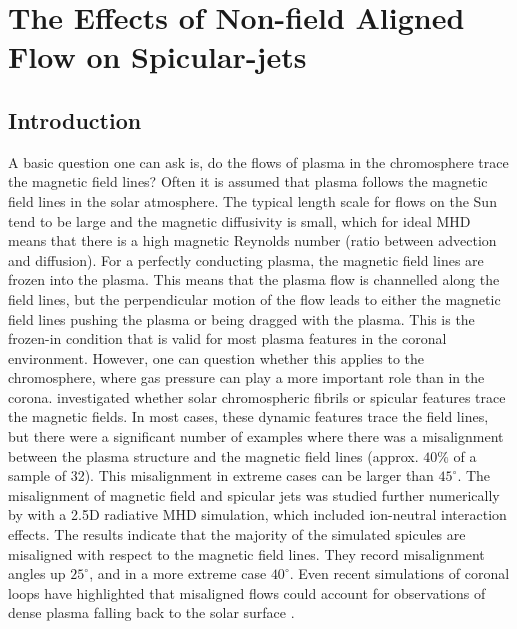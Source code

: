 \documentclass[12pt]{ociamthesis}
\newcommand{\np}{\\ \\}
\newcommand{\degs}{^{\circ}}
\begin{document}
\baselineskip=18pt

\setcounter{secnumdepth}{3}
\setcounter{tocdepth}{3}

\setcounter{chapter}{2}

\chapter{The Effects of Non-field Aligned Flow on Spicular-jets}
\section{Introduction}
\label{sec:c3intro}
A basic question one can ask is, do the flows of plasma in the chromosphere trace the magnetic field lines? Often it is assumed that plasma follows the magnetic field lines in the solar atmosphere. The typical length scale for flows on the Sun tend to be large and the magnetic diffusivity is small, which for ideal MHD means that there is a high magnetic Reynolds number (ratio between advection and diffusion). For a perfectly conducting plasma, the magnetic field lines are frozen into the plasma. This means that the plasma flow is channelled along the field lines, but the perpendicular motion of the flow leads to either the magnetic field lines pushing the plasma or being dragged with the plasma. This is the frozen-in condition that is valid for most plasma features in the coronal environment. However, one can question whether this applies to the chromosphere, where gas pressure can play a more important role than in the corona. \cite{delaCruzRodr2011AA527L8D} investigated whether solar chromospheric fibrils or spicular features trace the magnetic fields. In most cases, these dynamic features trace the field lines, but there were a significant number of examples where there was a misalignment between the plasma structure and the magnetic field lines (approx. $40\%$ of a sample of 32). This misalignment in extreme cases can be larger than $45\degs$. The misalignment of magnetic field and spicular jets was studied further numerically by \cite{Mart2016ApJ831L1M} with a 2.5D radiative MHD simulation, which included ion-neutral interaction effects. The results indicate that the majority of the simulated spicules are misaligned with respect to the magnetic field lines. They record misalignment angles up $25\degs$, and in a more extreme case $40\degs$. Even recent simulations of coronal loops have highlighted that misaligned flows could account for observations of dense plasma falling back to the solar surface \citep{Petralia2018AA609A18P}. \np
\end{document}
